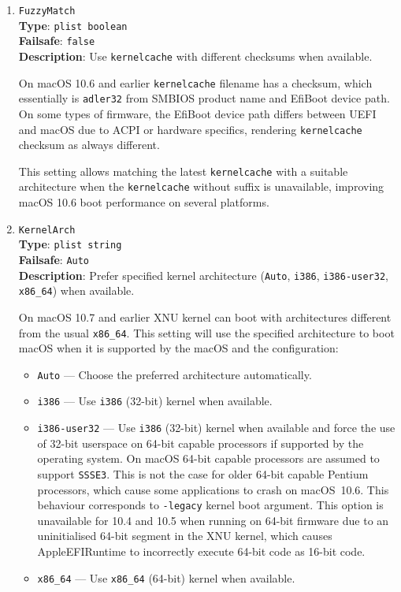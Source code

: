 \documentclass[]{article}
\providecommand{\tightlist}{%
  \setlength{\itemsep}{0pt}\setlength{\parskip}{0pt}}
\begin{document}
\begin{enumerate}

\item
  \texttt{FuzzyMatch}\\
  \textbf{Type}: \texttt{plist\ boolean}\\
  \textbf{Failsafe}: \texttt{false}\\
  \textbf{Description}: Use \texttt{kernelcache} with different checksums when available.

  On macOS 10.6 and earlier \texttt{kernelcache} filename has a checksum, which essentially
  is \texttt{adler32} from SMBIOS product name and EfiBoot device path. On some types of firmware,
  the EfiBoot device path differs between UEFI and macOS due to ACPI or hardware specifics,
  rendering \texttt{kernelcache} checksum as always different.

  This setting allows matching the latest \texttt{kernelcache} with a suitable architecture
  when the \texttt{kernelcache} without suffix is unavailable, improving macOS 10.6 boot
  performance on several platforms.

\item
  \texttt{KernelArch}\\
  \textbf{Type}: \texttt{plist\ string}\\
  \textbf{Failsafe}: \texttt{Auto}\\
  \textbf{Description}: Prefer specified kernel architecture (\texttt{Auto}, \texttt{i386},
  \texttt{i386-user32}, \texttt{x86\_64}) when available.

  On macOS 10.7 and earlier XNU kernel can boot with architectures different from
  the usual \texttt{x86\_64}. This setting will use the specified architecture to boot
  macOS when it is supported by the macOS and the configuration:

  \begin{itemize}
    \tightlist
    \item \texttt{Auto} --- Choose the preferred architecture automatically.
    \item \texttt{i386} --- Use \texttt{i386} (32-bit) kernel when available.
    \item \texttt{i386-user32} --- Use \texttt{i386} (32-bit) kernel when available
      and force the use of 32-bit userspace on 64-bit capable processors if supported
      by the operating system. On macOS 64-bit capable processors are assumed to
      support \texttt{SSSE3}. This is not the case for older 64-bit capable Pentium
      processors, which cause some applications to crash on macOS~10.6. This behaviour
      corresponds to \texttt{-legacy} kernel boot argument. This option is unavailable
      for 10.4 and 10.5 when running on 64-bit firmware due to an uninitialised 64-bit
      segment in the XNU kernel, which causes AppleEFIRuntime to incorrectly execute
      64-bit code as 16-bit code.
    \item \texttt{x86\_64} --- Use \texttt{x86\_64} (64-bit) kernel when available.
  \end{itemize}


\end{enumerate}
\end{document}
